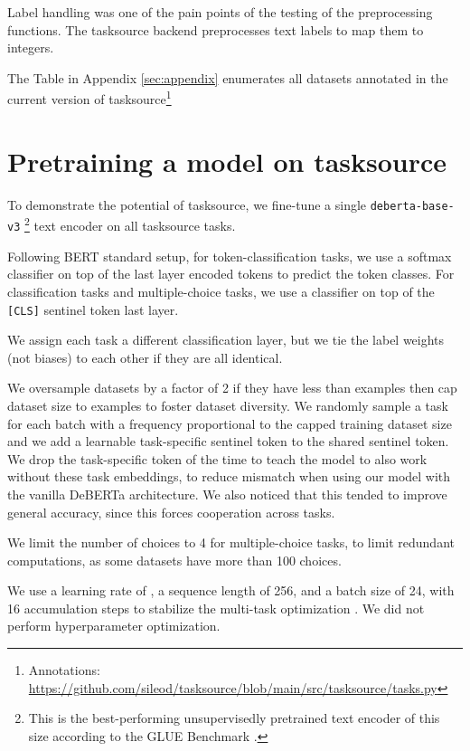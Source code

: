 \documentclass[11pt]{article}
\begin{document}
Label handling was one of the pain points of the testing of the preprocessing functions. The tasksource backend preprocesses text labels to map them to integers. 

The Table in Appendix \ref{sec:appendix} enumerates all datasets annotated in the current version of tasksource\footnote{Annotations: \url{https://github.com/sileod/tasksource/blob/main/src/tasksource/tasks.py}}

\section{Pretraining a model on tasksource \label{sec:model}}
To demonstrate the potential of tasksource, we fine-tune a single \texttt{deberta-base-v3} \citep{he2021debertav3}\footnote{This is the best-performing unsupervisedly pretrained text encoder of this size according to the GLUE Benchmark \citep{wang2019glue}.} text encoder on all tasksource tasks.

Following BERT \citep{devlin-etal-2019-bert} standard setup, for token-classification tasks, we use a softmax classifier on top of the last layer encoded tokens to predict the token classes. For classification tasks and multiple-choice tasks, we use a classifier on top of the \texttt{[CLS]} sentinel token last layer.

We assign each task a different classification layer, but we tie the label weights (not biases) to each other if they are all identical. 

We oversample datasets by a factor of 2 if they have less than  examples then cap dataset size to  examples to foster dataset diversity. We randomly sample a task for each batch with a frequency proportional to the capped training dataset size and we add a learnable task-specific sentinel token to the shared sentinel token. We drop the task-specific token  of the time to teach the model to also work without these task embeddings, to reduce mismatch when using our model with the vanilla DeBERTa architecture.  We also noticed that this tended to improve general accuracy, since this forces cooperation across tasks.

We limit the number of choices to 4 for multiple-choice tasks, to limit redundant computations, as some datasets have more than 100 choices.

We use a learning rate of , a sequence length of 256, and a batch size of 24, with 16 accumulation steps to stabilize the multi-task optimization \citep{yu2020gradient}. We did not perform hyperparameter optimization.
\end{document}

